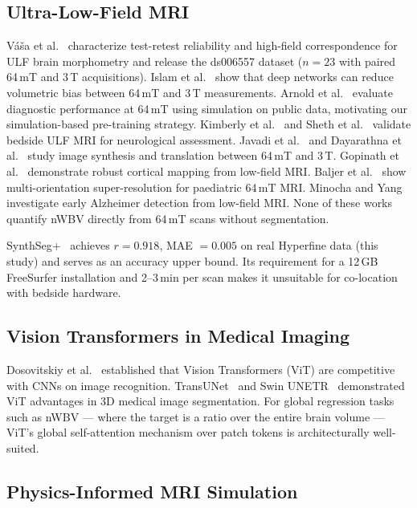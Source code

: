 \documentclass[12pt,a4paper]{article}
\begin{document}
\subsection{Ultra-Low-Field MRI}

V{\'a}{\v s}a et al.~\cite{vasa2025imaneur,vasa2025} characterize
test-retest reliability and high-field correspondence for ULF brain
morphometry and release the ds006557 dataset ($n = 23$ with paired 64\,mT
and 3\,T acquisitions). Islam et al.~\cite{islam2025aibrain} show that deep
networks can reduce volumetric bias between 64\,mT and 3\,T measurements.
Arnold et al.~\cite{arnold2022simulated} evaluate diagnostic performance at
64\,mT using simulation on public data, motivating our simulation-based
pre-training strategy. Kimberly et al.~\cite{kimberly2023bedside} and Sheth
et al.~\cite{sheth2021assessmentultralow} validate bedside ULF MRI for
neurological assessment. Javadi et al.~\cite{javadi2025diffusion} and
Dayarathna et al.~\cite{dayarathna2024adversarial} study image synthesis and
translation between 64\,mT and 3\,T. Gopinath et al.~\cite{gopinath2025cortical}
demonstrate robust cortical mapping from low-field MRI. Baljer et
al.~\cite{baljer2024paediatric} show multi-orientation super-resolution for
paediatric 64\,mT MRI. Minocha and Yang~\cite{minocha2024lfmri} investigate
early Alzheimer detection from low-field MRI. None of these works quantify
nWBV directly from 64\,mT scans without segmentation.

SynthSeg+~\cite{billot2023synthseg} achieves $r = 0.918$, MAE $= 0.005$
on real Hyperfine data (this study) and serves as an accuracy upper bound.
Its requirement for a 12\,GB FreeSurfer installation and 2--3\,min per scan
makes it unsuitable for co-location with bedside hardware.

\subsection{Vision Transformers in Medical Imaging}

Dosovitskiy et al.~\cite{dosovitskiy2020image} established that Vision
Transformers (ViT) are competitive with CNNs on image recognition.
TransUNet~\cite{chen2021transunet} and Swin UNETR~\cite{hatamizadeh2021swin}
demonstrated ViT advantages in 3D medical image segmentation. For global
regression tasks such as nWBV --- where the target is a ratio over the
entire brain volume --- ViT's global self-attention mechanism over patch
tokens is architecturally well-suited.

\subsection{Physics-Informed MRI Simulation}
\end{document}
